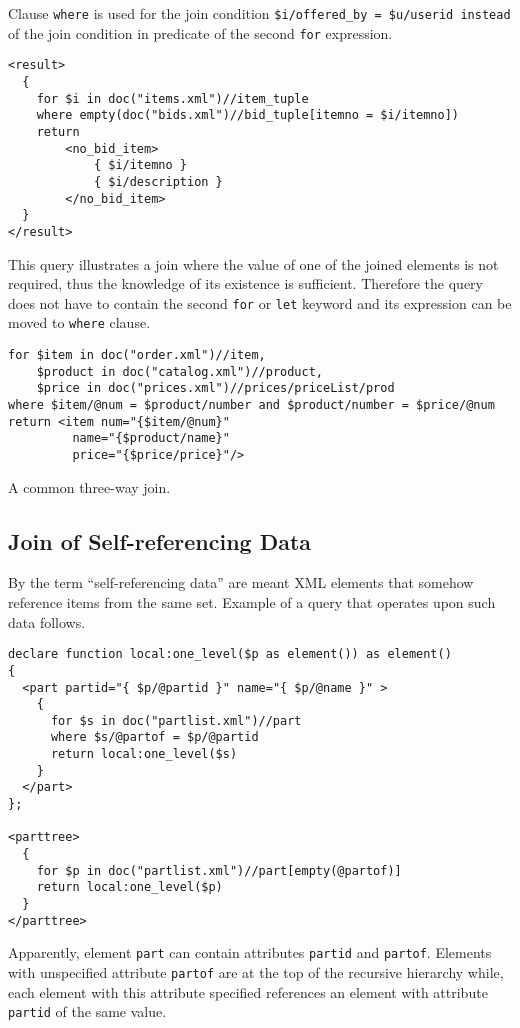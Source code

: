 Clause \texttt{where} is used for the join condition \texttt{\$i/offered\_by = \$u/userid instead} of the join condition in predicate of the second \texttt{for} expression.

\begin{verbatim}
<result>
  {
    for $i in doc("items.xml")//item_tuple
    where empty(doc("bids.xml")//bid_tuple[itemno = $i/itemno])
    return
        <no_bid_item>
            { $i/itemno }
            { $i/description }
        </no_bid_item>
  }
</result>
\end{verbatim}

This query illustrates a join where the value of one of the joined elements is not required, thus the knowledge of its existence is sufficient. Therefore the query does not have to contain the second \texttt{for} or \texttt{let} keyword and its expression can be moved to \texttt{where} clause.

\begin{verbatim}
for $item in doc("order.xml")//item, 
    $product in doc("catalog.xml")//product, 
    $price in doc("prices.xml")//prices/priceList/prod 
where $item/@num = $product/number and $product/number = $price/@num 
return <item num="{$item/@num}" 
         name="{$product/name}" 
         price="{$price/price}"/>
\end{verbatim}

A common three-way join.

\subsection{Join of Self-referencing Data}
By the term ``self-referencing data'' are meant XML elements that somehow reference items from the same set. Example of a query that operates upon such data follows.

\begin{verbatim}
declare function local:one_level($p as element()) as element()
{
  <part partid="{ $p/@partid }" name="{ $p/@name }" >
    {
      for $s in doc("partlist.xml")//part
      where $s/@partof = $p/@partid
      return local:one_level($s)
    }
  </part>
};

<parttree>
  {
    for $p in doc("partlist.xml")//part[empty(@partof)]
    return local:one_level($p)
  }
</parttree>
\end{verbatim}

Apparently, element \texttt{part} can contain attributes \texttt{partid} and \texttt{partof}. Elements with unspecified attribute \texttt{partof} are at the top of the recursive hierarchy while, each element with this attribute specified references an element with attribute \texttt{partid} of the same value.

